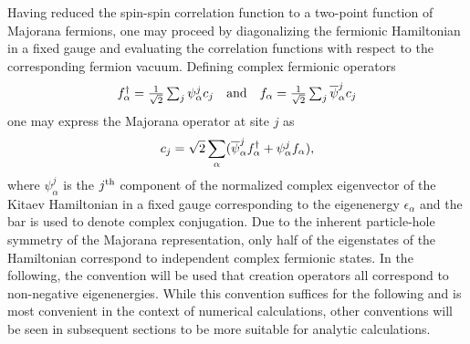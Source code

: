 Having reduced the spin-spin correlation function to a two-point function of Majorana fermions, one may proceed by diagonalizing the fermionic Hamiltonian in a fixed gauge and evaluating the correlation functions with respect to the corresponding fermion vacuum.
Defining complex fermionic operators
%
\begin{equation}
	\begin{matrix*}[l]
		f\dag_{\alpha}	= \frac{1}{\sqrt{2}} \sum_j \psi_{\alpha}^j c_j &
		{\rm and} &
		f_{\alpha}		= \frac{1}{\sqrt{2}} \sum_j \cc{\psi}_{\alpha}^j c_j
	\end{matrix*}
\end{equation}
%
one may express the Majorana operator at site $j$ as
%
\begin{equation}
	c_j = \sqrt{2} \sum_{\alpha} (\overline{\psi}_{\alpha}^j f^{\dagger}_{\alpha} + \psi_{\alpha}^j f_{\alpha}),
\end{equation}
%
where $\psi_{\alpha}^j$ is the $j^{\rm th}$ component of the normalized complex eigenvector of the Kitaev Hamiltonian in a fixed gauge corresponding to the eigenenergy $\epsilon_{\alpha}$ and the bar is used to denote complex conjugation.
Due to the inherent particle-hole symmetry of the Majorana representation, only half of the eigenstates of the Hamiltonian correspond to independent complex fermionic states.
In the following, the convention will be used that creation operators all correspond to non-negative eigenenergies.
While this convention suffices for the following and is most convenient in the context of numerical calculations, other conventions will be seen in subsequent sections to be more suitable for analytic calculations.


